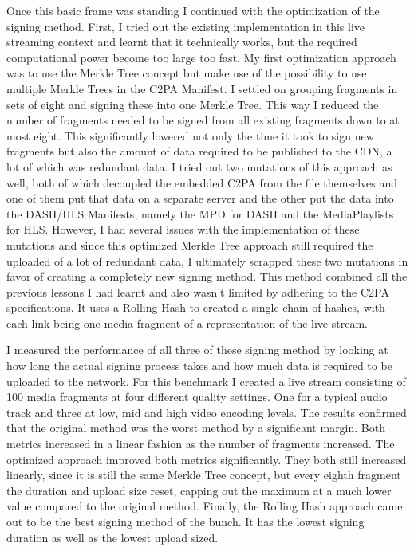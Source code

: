 Once this basic frame was standing I continued with the optimization of the signing method. First, I tried out the existing implementation in this live streaming context and learnt that it technically works, but the required computational power become too large too fast. My first optimization approach was to use the Merkle Tree concept but make use of the possibility to use multiple Merkle Trees in the C2PA Manifest. I settled on grouping fragments in sets of eight and signing these into one Merkle Tree. This way I reduced the number of fragments needed to be signed from all existing fragments down to at most eight. This significantly lowered not only the time it took to sign new fragments but also the amount of data required to be published to the CDN, a lot of which was redundant data. I tried out two mutations of this approach as well, both of which decoupled the embedded C2PA from the file themselves and one of them put that data on a separate server and the other put the data into the DASH/HLS Manifests, namely the MPD for DASH and the MediaPlaylists for HLS. However, I had several issues with the implementation of these mutations and since this optimized Merkle Tree approach still required the uploaded of a lot of redundant data, I ultimately scrapped these two mutations in favor of creating a completely new signing method. This method combined all the previous lessons I had learnt and also wasn't limited by adhering to the C2PA specifications. It uses a Rolling Hash to created a single chain of hashes, with each link being one media fragment of a representation of the live stream.

I measured the performance of all three of these signing method by looking at how long the actual signing process takes and how much data is required to be uploaded to the network. For this benchmark I created a live stream consisting of 100 media fragments at four different quality settings. One for a typical audio track and three at low, mid and high video encoding levels. The results confirmed that the original method was the worst method by a significant margin. Both metrics increased in a linear fashion as the number of fragments increased. The optimized approach improved both metrics significantly. They both still increased linearly, since it is still the same Merkle Tree concept, but every eighth fragment the duration and upload size reset, capping out the maximum at a much lower value compared to the original method. Finally, the Rolling Hash approach came out to be the best signing method of the bunch. It has the lowest signing duration as well as the lowest upload sized.

